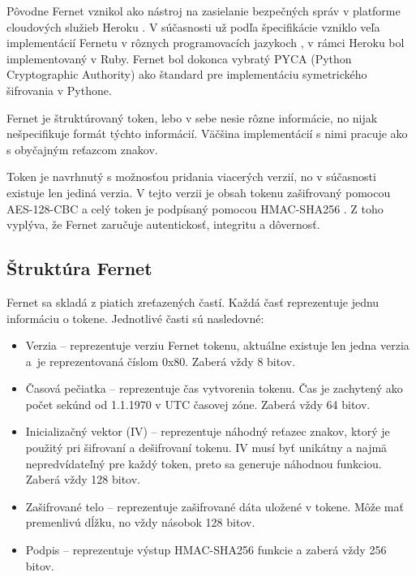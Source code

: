 Pôvodne Fernet vznikol ako nástroj na zasielanie bezpečných správ v platforme cloudových služieb Heroku \cite{fernet_legacy}. V súčasnosti už podľa špecifikácie \cite{fernet_spec} vzniklo veľa implementácií Fernetu v rôznych programovacích jazykoch \cite{fernet_cpp, fernet_haskell}, v rámci Heroku bol implementovaný v Ruby. Fernet bol dokonca vybratý PYCA (Python Cryptographic Authority) \cite{pyca_crypto} ako štandard pre implementáciu symetrického šifrovania v Pythone.

Fernet je štruktúrovaný token, lebo v sebe nesie rôzne informácie, no nijak nešpecifikuje formát týchto informácií. Väčšina implementácií s nimi pracuje ako s obyčajným reťazcom znakov. 

Token je navrhnutý s možnosťou pridania viacerých verzií, no v súčasnosti existuje len jediná verzia. V tejto verzii je obsah tokenu zašifrovaný pomocou AES-128-CBC \cite{aes_cbc} a celý token je podpísaný pomocou HMAC-SHA256 \cite{hmac}. Z toho vyplýva, že Fernet zaručuje autentickosť, integritu a dôvernosť.

\subsection{Štruktúra Fernet}

Fernet sa skladá z piatich zreťazených častí. Každá časť reprezentuje jednu informáciu o tokene. Jednotlivé časti sú nasledovné:

\begin{itemize}
    \item Verzia -- reprezentuje verziu Fernet tokenu, aktuálne existuje len jedna verzia a~je reprezentovaná číslom 0x80. Zaberá vždy 8 bitov.
    \item Časová pečiatka -- reprezentuje čas vytvorenia tokenu. Čas je zachytený ako počet sekúnd od 1.1.1970 v UTC časovej zóne. Zaberá vždy 64 bitov.
    \item Inicializačný vektor (IV) -- reprezentuje náhodný reťazec znakov, ktorý je použitý pri šifrovaní a dešifrovaní tokenu. IV musí byť unikátny a najmä nepredvídateľný pre každý token, preto sa generuje náhodnou funkciou. Zaberá vždy 128 bitov.
    \item Zašifrované telo -- reprezentuje zašifrované dáta uložené v tokene. Môže mať premenlivú dĺžku, no vždy násobok 128 bitov.
    \item Podpis -- reprezentuje výstup HMAC-SHA256 funkcie a zaberá vždy 256 bitov.
\end{itemize}

